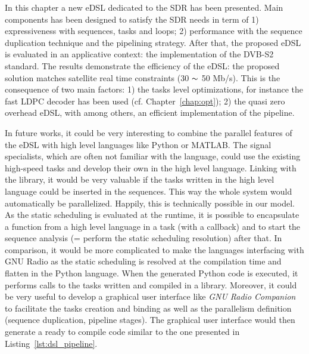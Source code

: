 In this chapter a new eDSL dedicated to the SDR has been presented. Main
components has been designed to satisfy the SDR needs in term of 1)
expressiveness with sequences, tasks and loops; 2) performance with the sequence
duplication technique and the pipelining strategy. After that, the proposed eDSL
is evaluated in an applicative context: the implementation of the DVB-S2
standard. The results demonstrate the efficiency of the \AFFECT eDSL: the
proposed solution matches satellite real time constraints (30 $\thicksim$ 50
Mb/s). This is the consequence of two main factors: 1) the tasks level
optimizations, for instance the fast LDPC decoder has been used (cf.
Chapter~\ref{chap:opt}); 2) the quasi zero overhead eDSL, with among others, an
efficient implementation of the pipeline.

In future works, it could be very interesting to combine the parallel features
of the \AFFECT eDSL with high level languages like Python or MATLAB. The signal
specialists, which are often not familiar with the \Cxx language, could use the
existing high-speed \Cxx tasks and develop their own in the high level
language. Linking with the \AFFECT library, it would be very valuable if the
tasks written in the high level language could be inserted in the \AFFECT
sequences. This way the whole system would automatically be parallelized.
Happily, this is technically possible in our model. As the static scheduling is
evaluated at the runtime, it is possible to encapsulate a function from a high
level language in a \AFFECT task (with a callback) and to start the sequence
analysis (= perform the static scheduling resolution) after that. In comparison,
it would be more complicated to make the languages interfacing with GNU Radio as
the static scheduling is resolved at the compilation time and flatten in the
Python language. When the generated Python code is executed, it performs calls
to the tasks written and compiled in a \Cxx library. Moreover, it could be very
useful to develop a graphical user interface like \emph{GNU Radio Companion} to
facilitate the tasks creation and binding as well as the parallelism definition
(sequence duplication, pipeline stages). The graphical user interface would then
generate a ready to compile \Cxx code similar to the one presented in
Listing~\ref{lst:dsl_pipeline}.